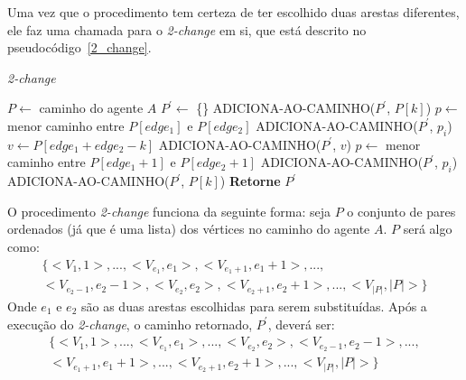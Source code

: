 Uma vez que o procedimento tem certeza de ter escolhido duas arestas diferentes, 
ele faz uma chamada para o \textit{2-change} em si, que está descrito no 
pseudocódigo~\ref{2_change}.

\begin{algorithm}                  %
	\caption{\textit{2-change}}          %
	\label{2_change}                           %
	\begin{algorithmic}[1]                    %
		\newline
		\State $P \gets $ caminho do agente $A$
		\State $P^{\prime}  \gets $ \{\} 
		 
				\State ADICIONA-AO-CAMINHO($P^{\prime}$, $P[k]$) 
				\State $p \gets $ menor caminho entre $P[edge_{1}]$ e $P[edge_{2}]$
					\State ADICIONA-AO-CAMINHO($P^{\prime}$, $p_{i}$)
				\EndFor
				\State $v \gets P[edge_{1} + edge_{2} - k]$ 
				\State ADICIONA-AO-CAMINHO($P^{\prime}$, $v$)
				\State $p \gets $ menor caminho entre $P[edge_{1}+1]$ e $P[edge_{2}+1]$
					\State ADICIONA-AO-CAMINHO($P^{\prime}$, $p_{i}$)
				\EndFor
			\Else
				\State ADICIONA-AO-CAMINHO($P^{\prime}$, $P[k]$)
			\EndIf
		\EndFor
		\State \textbf{Retorne} $P^{\prime}$
		\EndProcedure
	\end{algorithmic}
\end{algorithm}

O procedimento \textit{2-change} funciona da seguinte forma: seja $P$ o conjunto 
de pares ordenados (já que é uma lista) dos vértices no caminho do agente $A$. 
$P$ será algo como:
\begin{multline*}
\{<V_{1},1>,...,<V_{e_{1}},e_{1}>,<V_{e_{1}+1},e_{1}+1>,..., \\
<V_{e_{2}-1},e_{2}-1>,<V_{e_{2}},e_{2}>,<V_{e_{2}+1},e_{2}+1>,...,<V_{|P|},|P|>\}
\end{multline*}
Onde $e_{1}$ e $e_{2}$ são as duas arestas escolhidas para serem substituídas. 
Após a execução do \textit{2-change}, o caminho retornado, $P^{\prime}$, deverá 
ser:
\begin{multline*}
\{<V_{1},1>,...,<V_{e_{1}},e_{1}>,...,<V_{e_{2}},e_{2}>,<V_{e_{2}-1},e_{2}-1>,..., \\
<V_{e_{1}+1},e_{1}+1>,...,<V_{e_{2}+1},e_{2}+1>,...,<V_{|P|},|P|>\}
\end{multline*}


